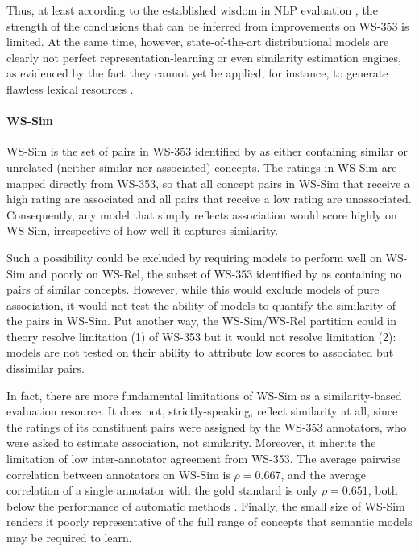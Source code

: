 \documentclass[fullname]{clv2}
\begin{document}
Thus, at least according to the established wisdom in NLP evaluation \cite{yong1999case,cunningham2005information,resnik201011}, the strength of the conclusions that can be inferred from improvements on WS-353 is limited. At the same time, however, state-of-the-art distributional models are clearly not perfect representation-learning or even similarity estimation engines, as evidenced by the fact they cannot yet be applied, for instance, to generate flawless lexical resources \cite{alfonseca2002extending}. 

\paragraph{\bf WS-Sim} WS-Sim is the set of pairs in WS-353 identified by  as either containing similar or unrelated (neither similar nor associated) concepts. The ratings in WS-Sim are mapped directly from WS-353, so that all concept pairs in WS-Sim that receive a high rating are associated and all pairs that receive a low rating are unassociated. Consequently, any model that simply reflects association would score highly on WS-Sim, irrespective of how well it captures similarity. 

Such a possibility could be excluded by requiring models to perform well on WS-Sim and poorly on WS-Rel, the subset of WS-353 identified by  as containing no pairs of similar concepts. However, while this would exclude models of pure association, it would not test the ability of models to quantify the similarity of the pairs in WS-Sim. Put another way, the WS-Sim/WS-Rel partition could in theory resolve limitation (1) of WS-353 but it would not resolve limitation (2): models are not tested on their ability to attribute low scores to associated but dissimilar pairs. 

In fact, there are more fundamental limitations of WS-Sim as a similarity-based evaluation resource. It does not, strictly-speaking, reflect similarity at all, since the ratings of its constituent pairs were assigned by the WS-353 annotators, who were asked to estimate association, not similarity. Moreover, it inherits the limitation of low inter-annotator agreement from WS-353. The average pairwise correlation between annotators on WS-Sim is \( \rho = 0.667\), and the average correlation of a single annotator with the gold standard is only \( \rho = 0.651\), both below the performance of automatic methods \cite{agirre2009study}. Finally, the small size of WS-Sim renders it poorly representative of the full range of concepts that semantic models may be required to learn. 
\end{document}

